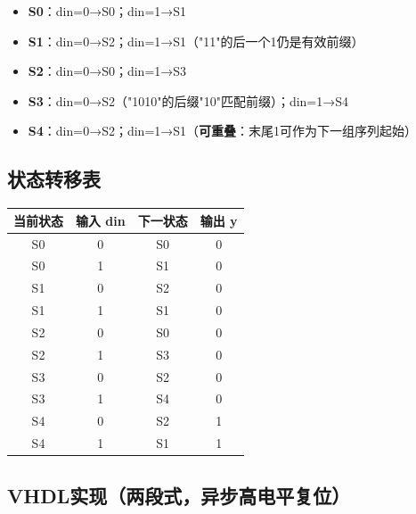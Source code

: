 \begin{itemize}
  \item \textbf{S0}：din=0→S0；din=1→S1
  \item \textbf{S1}：din=0→S2；din=1→S1（"11"的后一个1仍是有效前缀）
  \item \textbf{S2}：din=0→S0；din=1→S3
  \item \textbf{S3}：din=0→S2（"1010"的后缀"10"匹配前缀）；din=1→S4
  \item \textbf{S4}：din=0→S2；din=1→S1（\textbf{可重叠}：末尾1可作为下一组序列起始）
\end{itemize}

\subsection{状态转移表}

\begin{center}
\begin{tabular}{|c|c|c||c|}
\hline
\textbf{当前状态} & \textbf{输入 din} & \textbf{下一状态} & \textbf{输出 y} \\
\hline
S0 & 0 & S0 & 0 \\
S0 & 1 & S1 & 0 \\
S1 & 0 & S2 & 0 \\
S1 & 1 & S1 & 0 \\
S2 & 0 & S0 & 0 \\
S2 & 1 & S3 & 0 \\
S3 & 0 & S2 & 0 \\
S3 & 1 & S4 & 0 \\
S4 & 0 & S2 & 1 \\
S4 & 1 & S1 & 1 \\
\hline
\end{tabular}
\end{center}

\subsection{VHDL实现（两段式，异步高电平复位）}

